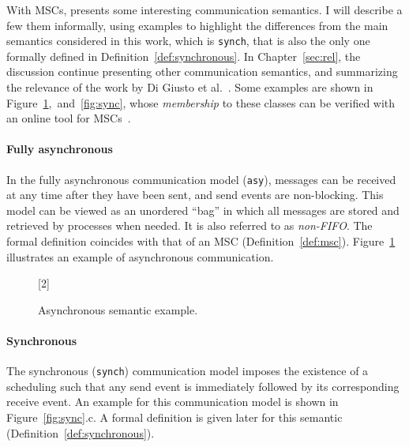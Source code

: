 With MSCs, \cite{di2023partial} presents some interesting communication
semantics. I will describe a few them informally, using examples to
highlight the differences from the main semantics considered in this work,
which is \verb|synch|, that is also the only one formally defined in 
Definition~\ref{def:synchronous}. In Chapter~\ref{sec:rel}, the discussion
continue presenting other communication semantics, and summarizing
the relevance of the work by Di Giusto et al.~\cite{di2023partial}.
Some examples are shown in Figure~\ref{fig:asy},~and~\ref{fig:sync},
whose \emph{membership} to these classes
can be verified with an online tool for MSCs~\cite{MSCTool}. 

\paragraph{Fully asynchronous}

In the fully asynchronous communication model (\verb|asy|), messages can be 
received at any time after they have been sent, and send events are 
non-blocking. This model can be viewed as an unordered ``bag'' in which 
all messages are stored and retrieved by processes when needed. It is also 
referred to as \emph{non-FIFO}. The formal definition coincides with that of 
an MSC (Definition~\ref{def:msc}). Figure~\ref{fig:asy} illustrates an example of asynchronous 
communication.

\begin{figure}[!ht]
    \centering
      \begin{msc}[draw frame=none, draw head=none, msc keyword=, 
                  head height=0px, label distance=0.5ex, 
                  foot height=0px, foot distance=0px]{}

          [2]
          \nextlevel
      \end{msc}
  \caption{Asynchronous semantic example.}
  \label{fig:asy}
\end{figure}

\paragraph{Synchronous}
The synchronous (\verb|synch|) communication model imposes 
the existence of a scheduling such that any send event is 
immediately followed by its corresponding receive event. 
An example for this communication model is shown in 
Figure~\ref{fig:sync}.c. A formal definition is given later 
for this semantic (Definition~\ref{def:synchronous}).

